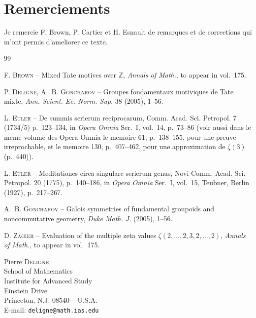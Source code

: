 \documentclass[11pt,a4paper]{article}
\theoremstyle{plain}
\theoremstyle{definition}
\newcommand{\Z}{\mathbb{Z}}
\begin{document}
\section*{Remerciements}

Je remercie F. Brown, P. Cartier et H. Esnault de remarques et de corrections qui m'ont permis d'ameliorer ce texte.

\begin{thebibliography}{99}

F. \textsc{Brown} -- Mixed Tate motives over $\Z$, \textit{Annals of Math.}, to appear in vol.~175.

P. \textsc{Deligne}, A.~B. \textsc{Goncharov} -- Groupes fondamentaux motiviques de Tate mixte, \textit{Ann. Scient. Ec. Norm. Sup.} 38 (2005), 1--56.

L. \textsc{Euler} -- De summis serierum reciprocarum, Comm. Acad. Sci. Petropol. 7 (1734/5) p.~123--134, in \textit{Opera Omnia} Ser.~I, vol.~14, p.~73--86 (voir aussi dans le meme volume des Opera Omnia le memoire 61, p.~138--155, pour une preuve irreprochable, et le memoire 130, p.~407--462, pour une approximation de $\zeta(3)$ (p.~440)).

L. \textsc{Euler} -- Meditationes circa singulare serierum genus, Novi Comm. Acad. Sci. Petropol. 20 (1775), p.~140--186, in \textit{Opera Omnia} Ser.~I, vol.~15, Teubner, Berlin (1927), p.~217--267.

A.~B. \textsc{Goncharov} -- Galois symmetries of fundamental groupoids and noncommutative geometry, \textit{Duke Math. J.} (2005), 1--56.

D. \textsc{Zagier} -- Evaluation of the multiple zeta values $\zeta(2,\ldots,2,3,2,\ldots,2)$, \textit{Annals of Math.}, to appear in vol.~175.

\end{thebibliography}

\vspace{1em}
\noindent Pierre \textsc{Deligne}\\
School of Mathematics\\
Institute for Advanced Study\\
Einstein Drive\\
Princeton, N.J. 08540 -- U.S.A.\\
E-mail: \texttt{deligne@math.ias.edu}
\end{document}
